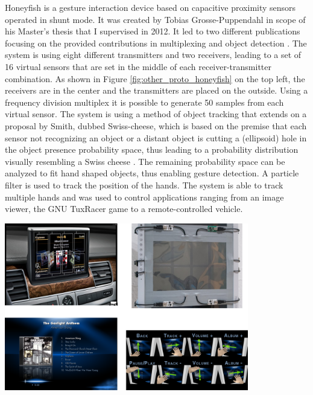 Honeyfish is a gesture interaction device based on capacitive proximity sensors operated in shunt mode. It was created by Tobias Grosse-Puppendahl in scope of his Master's thesis that I supervised in 2012. It led to two different publications focusing on the provided contributions in multiplexing and object detection \cite{grosse2012honey}\cite{grosse2013swiss}. The system is using eight different transmitters and two receivers, leading to a set of 16 virtual sensors that are set in the middle of each receiver-transmitter combination. As shown in Figure \ref{fig:other_proto_honeyfish} on the top left, the receivers are in the center and the transmitters are placed on the outside. Using a frequency division multiplex it is possible to generate 50 samples from each virtual sensor. The system is using a method of object tracking that extends on a proposal by Smith, dubbed Swiss-cheese, which is based on the premise that each sensor not recognizing an object or a distant object is cutting a (ellipsoid) hole in the object presence probability space, thus leading to a probability distribution visually resembling a Swiss cheese \cite{Smith1996a}. The remaining probability space can be analyzed to fit hand shaped objects, thus enabling gesture detection. A particle filter is used to track the position of the hands. The system is able to track multiple hands and was used to control applications ranging from an image viewer, the GNU TuxRacer game to a remote-controlled vehicle.
\begin{minipage}{\linewidth}
\centering
\includegraphics[width=0.8\textwidth]{images/other_proto_gestdisp}
\label{fig:other_proto_gestdisp}
\end{minipage}

